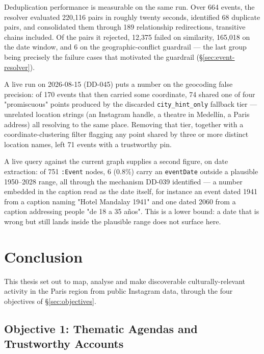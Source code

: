\documentclass[12pt, a4paper]{report}
\begin{document}
Deduplication performance is measurable on the same run. Over 664 events,
the resolver evaluated 220{,}116 pairs in roughly twenty seconds,
identified 68 duplicate pairs, and consolidated them through 189
relationship redirections, transitive chains included. Of the pairs it
rejected, 12{,}375 failed on similarity, 165{,}018 on the date window,
and 6 on the geographic-conflict guardrail — the last group being
precisely the failure cases that motivated the guardrail
(\S\ref{sec:event-resolver}).

A live run on 2026-08-15 (DD-045) puts a number on the geocoding false
precision: of 170 events that then carried some coordinate, 74 shared
one of four "promiscuous" points produced by the discarded
\texttt{city\_hint\_only} fallback tier — unrelated location strings (an
Instagram handle, a theatre in Medellín, a Paris address) all resolving
to the same place. Removing that tier, together with a
coordinate-clustering filter flagging any point shared by three or more
distinct location names, left 71 events with a trustworthy pin.

A live query against the current graph supplies a second figure, on date
extraction: of 751 \texttt{:Event} nodes, 6 (0.8\%) carry an
\texttt{eventDate} outside a plausible 1950--2028 range, all through the
mechanism DD-039 identified — a number embedded in the caption read as
the date itself, for instance an event dated 1941 from a caption naming
"Hotel Mandalay 1941" and one dated 2060 from a caption addressing
people "de 18 a 35 años". This is a lower bound: a date that is wrong
but still lands inside the plausible range does not surface here.


\chapter{Conclusion}
\label{ch:conclusion}

This thesis set out to map, analyse and make discoverable
culturally-relevant activity in the Paris region from public Instagram
data, through the four objectives of \S\ref{sec:objectives}.

\section{Objective 1: Thematic Agendas and Trustworthy Accounts}
\end{document}
